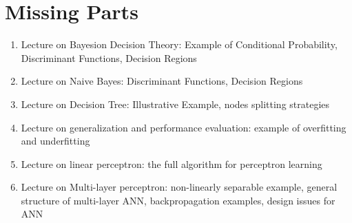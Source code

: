 \chapter{Missing Parts}

\begin{enumerate}
    \item Lecture on Bayesion Decision Theory: Example of Conditional Probability, Discriminant Functions, Decision Regions
    \item Lecture on Naive Bayes: Discriminant Functions, Decision Regions
    \item Lecture on Decision Tree: Illustrative Example, nodes splitting strategies
    \item Lecture on generalization and performance evaluation: example of overfitting and underfitting 
    \item Lecture on linear perceptron: the full algorithm for perceptron learning
    \item Lecture on Multi-layer perceptron: non-linearly separable example, general structure of multi-layer ANN, backpropagation examples, design issues for ANN
\end{enumerate}